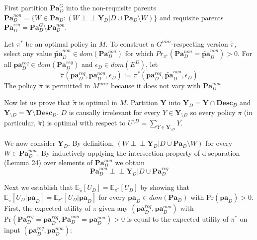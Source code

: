 \documentclass[letterpaper,10pt]{article}
\newcommand\indep{\perp \!\!\! \perp}
\begin{document}
First partition $\mathbf{Pa}_D^G$ into the non-requisite parents $\mathbf{Pa}^{non}_D=\{W\in \mathbf{Pa}_D : (W\indep \mathbf{Y}_D | D \cup \mathbf{Pa}_D \setminus W)\}$ and requisite parents $\mathbf{Pa}_D^{req}=\mathbf{Pa}_D^G\setminus\mathbf{Pa}^{non}_D$.

Let $\pi^*$ be an optimal policy in $M$.
To construct a $G^{min}$-respecting version $\tilde{\pi}$, select any value $\mathbf{\tilde{pa}}^{non}_D \in dom(\mathbf{Pa}^{non}_D)$ for which $Pr_{\pi^*}(\mathbf{Pa}^{non}_D = \mathbf{\tilde{pa}}^{non}_D)>0$.
For all $\mathbf{pa}_D^{req} \in dom(\mathbf{Pa}_D^{req})$ and $\epsilon_D \in dom(E^D)$, let
\[
\tilde{\pi}(\mathbf{pa}_D^{req},\mathbf{pa}^{non}_D,\epsilon_D) := \pi^*(\mathbf{pa}_D^{req},\mathbf{\tilde{pa}}^{non}_D,\epsilon_D)
\]
The policy $\tilde{\pi}$ is permitted in $M^{min}$ because it does not vary with $\mathbf{Pa}^{non}_D$.

Now let us prove that $\tilde{\pi}$ is optimal in $M$.
Partition $\mathbf{Y}$ into $\mathbf{Y}_D=\mathbf{Y}\cap \textbf{Desc}_D$ and $\mathbf{Y}_{\setminus D}=\mathbf{Y}\setminus \textbf{Desc}_D$.
$D$ is causally irrelevant for every $Y\in\mathbf{Y}_{\setminus D}$ so every policy $\pi$ (in particular, $\tilde{\pi}$) is optimal with respect to $U^{\setminus D}=\sum_{Y\in\mathbf{Y}_{\setminus D}}Y$.

We now consider $\mathbf{Y}_D$.
By definition, $(W\indep \mathbf{Y}_D | D \cup \mathbf{Pa}_D \setminus W)$ for every $W\in \mathbf{Pa}^{non}_D$.
By inductively applying the intersection property of d-separation (Lemma 24) over elements of $\mathbf{Pa}^{non}_D$ we obtain
\begin{equation}\label{intersected0}
\mathbf{Pa}^{non}_D \indep \mathbf{Y}_D | D \cup \mathbf{Pa}^{req}_D
\end{equation}

Next we establish that $\mathbb{E}_{\tilde{\pi}} [U_{D}]=\mathbb{E}_{\pi^*} [U_{D}]$ by showing that $\mathbb{E}_{\tilde{\pi}} [U_{D}|\mathbf{pa}_D] = \mathbb{E}_{\pi^*} [U_{D}|\mathbf{pa}_D]$ for every $\mathbf{pa}_D\in dom(\mathbf{Pa}_D)$ with $\text{Pr}(\mathbf{pa}_D)>0$.
First, the expected utility of $\tilde{\pi}$ given any $(\mathbf{pa}_D^{req},\mathbf{pa}^{non}_D)$ with $\text{Pr}(\mathbf{Pa}_D^{req}=\mathbf{pa}_D^{req},\mathbf{Pa}^{non}_D=\mathbf{pa}^{non}_D)>0$ is equal to the expected utility of $\pi^*$ on input $(\mathbf{pa}_D^{req},\mathbf{pa}^{non}_D)$:
\end{document}
